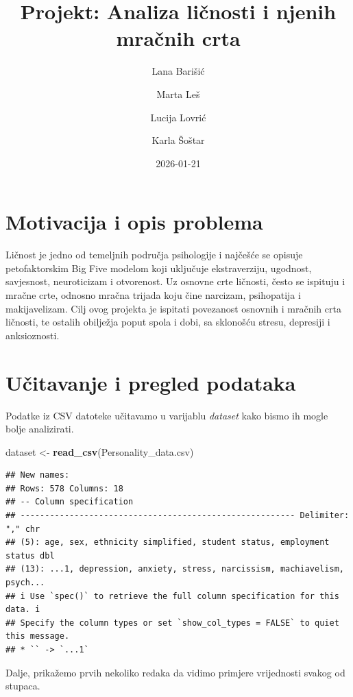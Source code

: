 \documentclass[
]{article}
\title{Projekt: Analiza ličnosti i njenih mračnih crta}
\author{Lana Barišić \and Marta Leš \and Lucija Lovrić \and Karla
Šoštar}
\date{2026-01-21}
\newenvironment{Shaded}{\begin{snugshade}}{\end{snugshade}}
\newcommand{\FunctionTok}[1]{\textcolor[rgb]{0.13,0.29,0.53}{\textbf{#1}}}
\newcommand{\NormalTok}[1]{#1}
\newcommand{\OtherTok}[1]{\textcolor[rgb]{0.56,0.35,0.01}{#1}}
\newcommand{\StringTok}[1]{\textcolor[rgb]{0.31,0.60,0.02}{#1}}
\begin{document}
\maketitle

\section{Motivacija i opis problema}\label{motivacija-i-opis-problema}

Ličnost je jedno od temeljnih područja psihologije i najčešće se opisuje
petofaktorskim Big Five modelom koji uključuje ekstraverziju, ugodnost,
savjesnost, neuroticizam i otvorenost. Uz osnovne crte ličnosti, često
se ispituju i mračne crte, odnosno mračna trijada koju čine narcizam,
psihopatija i makijavelizam. Cilj ovog projekta je ispitati povezanost
osnovnih i mračnih crta ličnosti, te ostalih obilježja poput spola i
dobi, sa sklonošću stresu, depresiji i anksioznosti.

\section{Učitavanje i pregled
podataka}\label{uux10ditavanje-i-pregled-podataka}

Podatke iz CSV datoteke učitavamo u varijablu \emph{dataset} kako bismo
ih mogle bolje analizirati.

\begin{Shaded}
\begin{Highlighting}[]
\NormalTok{dataset }\OtherTok{\textless{}{-}} \FunctionTok{read\_csv}\NormalTok{(}\StringTok{\textquotesingle{}Personality\_data.csv\textquotesingle{}}\NormalTok{)}
\end{Highlighting}
\end{Shaded}

\begin{verbatim}
## New names:
## Rows: 578 Columns: 18
## -- Column specification
## -------------------------------------------------------- Delimiter: "," chr
## (5): age, sex, ethnicity simplified, student status, employment status dbl
## (13): ...1, depression, anxiety, stress, narcissism, machiavelism, psych...
## i Use `spec()` to retrieve the full column specification for this data. i
## Specify the column types or set `show_col_types = FALSE` to quiet this message.
## * `` -> `...1`
\end{verbatim}

Dalje, prikažemo prvih nekoliko redaka da vidimo primjere vrijednosti
svakog od stupaca.
\end{document}
